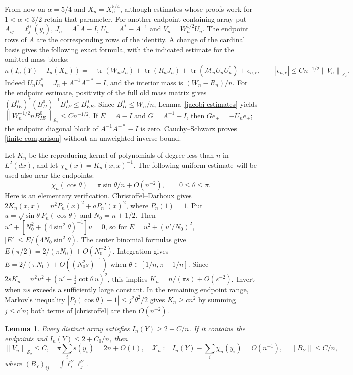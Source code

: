 \documentclass[a4paper,11pt]{amsart}
\newtheorem{lemma}[theorem]{Lemma}
\theoremstyle{remark}\newtheorem{remark}[theorem]{Remark}
\newcommand{\tr}{\operatorname{tr}}
\newcommand{\HS}{\mathcal S_2}
\newcommand{\norm}[1]{\left\lVert#1\right\rVert}
\begin{document}
From now on $\alpha=5/4$ and $X_n=X_n^{5/4}$, although estimates
whose proofs work for $1<\alpha<3/2$ retain that parameter.
For another endpoint-containing array put
$A_{ij}=\ell_j^0(y_i)$, $J_n=A^*A-I$, $U_n=A^*-A^{-1}$ and
$V_n=W_n^{1/2}U_n$. The endpoint rows of $A$ are the corresponding
rows of the identity. A change of the cardinal basis gives the following
exact formula, with the indicated estimate for the omitted mass blocks:
\begin{equation}\label{finite-comparison}
 n(I_n(Y)-I_n(X_n))=-\tr(W_nJ_n)+\tr(R_nJ_n)
 +\tr(\mathcal M_nU_nU_n^*)+\epsilon_{n,e},\qquad
 |\epsilon_{n,e}|\le Cn^{-1/2}\norm{V_n}_{\HS}.
\end{equation}
Indeed $U_nU_n^*=J_n+A^{-1}A^{-*}-I$, and the interior mass is
$(W_n-R_n)/n$. For the endpoint estimate, positivity of the full
old mass matrix gives
$(B^0_{IE})^*(B^0_{II})^{-1}B^0_{IE}\le B^0_{EE}$.
Since $B^0_{II}\le W_n/n$, Lemma~\ref{jacobi-estimates} yields
$\norm{W_n^{-1/2}nB^0_{IE}}_{\HS}\le Cn^{-1/2}$.
If $E=A-I$ and $G=A^{-1}-I$, then $G e_\pm=-U_ne_\pm$;
the endpoint diagonal block of $A^{-1}A^{-*}-I$ is zero.
Cauchy--Schwarz proves \eqref{finite-comparison} without an
unweighted inverse bound.

Let $K_n$ be the reproducing kernel of polynomials of degree less than
$n$ in $L^2(dx)$, and let $\chi_n(x)=K_n(x,x)^{-1}$.
The following uniform estimate will be used also near the endpoints:
\begin{equation}\label{christoffel}
 \chi_n(\cos\theta)=\pi\sin\theta/n+O(n^{-2}),
 \qquad 0\le\theta\le\pi.
\end{equation}
Here is an elementary verification. Christoffel--Darboux gives
$2K_n(x,x)=n^2P_n(x)^2+aP_n'(x)^2$, where $P_n(1)=1$.
Put $u=\sqrt{\sin\theta}P_n(\cos\theta)$ and $N_0=n+1/2$.
Then $u''+[N_0^2+(4\sin^2\theta)^{-1}]u=0$, so for
$E=u^2+(u'/N_0)^2$, $|E'|\le E/(4N_0\sin^2\theta)$.
The center binomial formulas give $E(\pi/2)=2/(\pi N_0)+O(N_0^{-2})$.
Integration gives $E=2/(\pi N_0)+O((N_0^2s)^{-1})$ when
$\theta\in[1/n,\pi-1/n]$. Since
$2sK_n=n^2u^2+(u'-\tfrac12\cot\theta\,u)^2$, this implies
$K_n=n/(\pi s)+O(s^{-2})$. Invert when $ns$ exceeds a sufficiently
large constant. In the remaining endpoint range, Markov's inequality
$|P_j(\cos\theta)-1|\le j^2\theta^2/2$ gives $K_n\ge c n^2$
by summing $j\le c'n$; both terms of \eqref{christoffel} are then
$O(n^{-2})$.

\begin{lemma}\label{coercivity}
Every distinct array satisfies $I_n(Y)\ge2-C/n$. If it contains the
endpoints and $I_n(Y)\le2+C_0/n$, then
\begin{equation}\label{finite-bounds}
 \norm{V_n}_{\HS}\le C,\quad
 \pi\sum_i s(y_i)=2n+O(1),\quad
 \mathscr X_n:=I_n(Y)-\sum_i\chi_n(y_i)=O(n^{-1}),\quad
 \norm{B_Y}\le C/n,
\end{equation}
where $(B_Y)_{ij}=\int\ell_i^Y\ell_j^Y$.
\end{lemma}
\end{document}
